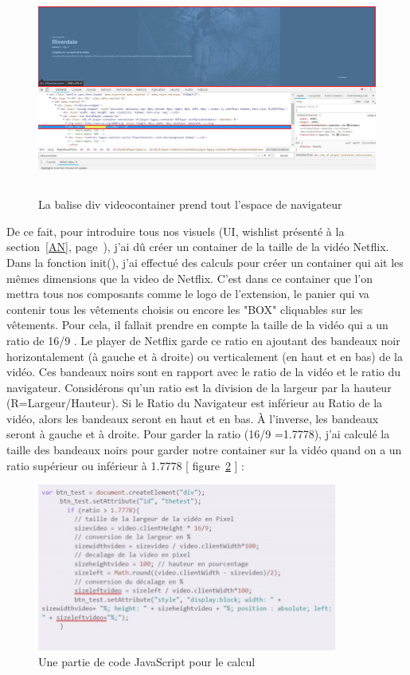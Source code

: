 \documentclass[a4paper, 12pt]{report}
\begin{document}
\pagebreak
\newpage
\begin{figure}[!ht]
\begin{center}
\includegraphics[height=7cm]{images/Videocontainer.jpg}
\caption{La balise div videocontainer prend tout l'espace de navigateur}
\label{fig:4.2.2}
\end{center}
\end{figure}
De ce fait, pour introduire tous nos visuels (UI, wishlist présenté à la section~\ref{AN}, page~\pageref{AN}), j’ai dû créer un container de la taille de la vidéo Netflix.\\
Dans la fonction init(), j'ai effectué des calculs pour créer un container qui ait les mêmes dimensions que la video de Netflix. C'est dans ce container que l'on mettra tous nos composants comme le logo de l'extension, le panier qui va contenir tous les vêtements choisis ou encore les "BOX" cliquables sur les vêtements.
Pour cela, il fallait prendre en compte la taille de la vidéo qui a un ratio de 16/9 . Le player de Netflix garde ce ratio en ajoutant des bandeaux noir horizontalement (à gauche et à droite) ou verticalement (en haut et en bas) de la vidéo. Ces bandeaux noirs sont en rapport avec le ratio de la vidéo et le ratio du navigateur. Considérons qu'un ratio est la division de la largeur par la hauteur (R=Largeur/Hauteur). Si le Ratio du Navigateur est inférieur au Ratio de la vidéo, alors les bandeaux seront en haut et en bas. À l'inverse, les bandeaux seront à gauche et à droite. 
Pour garder la ratio (16/9 =1.7778), j’ai calculé la taille des bandeaux noirs pour garder notre container sur la vidéo quand on a un ratio supérieur ou inférieur à 1.7778 [ figure~\ref{fig:4.4} ] :\\
\begin{figure}[!ht]
\begin{center}
\includegraphics[height=5.5cm]{images/codeJavaScript1.jpg}
\caption{Une partie de code JavaScript pour le calcul }
\label{fig:4.4}
\end{center}
\end{figure}
\end{document}

